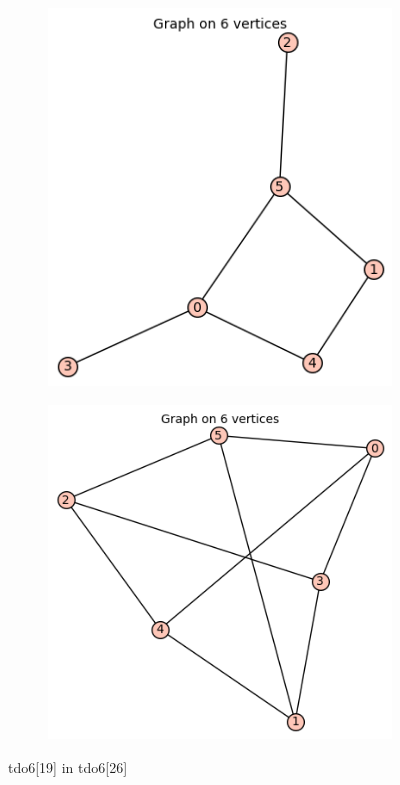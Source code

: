 \documentclass[12pt, a4paper]{article}
\begin{document}
\begin{center}
\begin{figure}[!htb]
\centering
\begin{subfigure}{0.5\textwidth}
  \centering
  \includegraphics[width=0.4\linewidth]{tdo6[19]}
\end{subfigure}%
\begin{subfigure}{0.5\textwidth}
  \centering
  \includegraphics[width=0.44\linewidth]{tdo6[26]}
\end{subfigure}
\caption{tdo6[19] in tdo6[26]}
\label{fig:test}
\end{figure}


\end{center}
\end{document}

